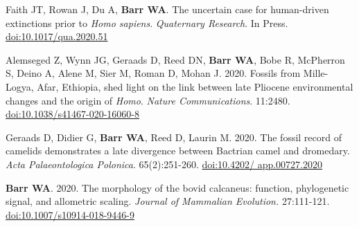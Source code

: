 



\item Faith JT, Rowan J, Du A, {\bfseries Barr WA}. The uncertain case for human-driven extinctions prior to \emph{Homo sapiens}. \emph{Quaternary Research}. In Press. \href{https://dx.doi.org/10.1017/qua.2020.51}{doi:10.1017/qua.2020.51}

\item Alemseged Z, Wynn JG, Geraads D, Reed DN, {\bfseries Barr WA}, Bobe R, McPherron S, Deino A, Alene M, Sier M, Roman D,  Mohan J. 2020. Fossils from Mille-Logya, Afar, Ethiopia, shed light on the link between late Pliocene environmental changes and the origin of \emph{Homo}. \emph{Nature Communications}. 11:2480. \href{https://doi.org/10.1038/s41467-020-16060-8 }{doi:10.1038/s41467-020-16060-8}

\item Geraads D, Didier G, {\bfseries Barr WA}, Reed D, Laurin M. 2020. The fossil record of camelids demonstrates a late divergence between Bactrian camel and dromedary. \emph{Acta Palaeontologica Polonica}. 65(2):251-260. \href{https://doi.org/10.4202/app.00727.2020}{doi:10.4202/ app.00727.2020}

\item {\bfseries Barr WA}. 2020. The morphology of the bovid calcaneus: function, phylogenetic signal, and allometric scaling. \emph{Journal of Mammalian Evolution.}  27:111-121. \href{https://dx.doi.org/10.1007/s10914-018-9446-9}{doi:10.1007/s10914-018-9446-9}

